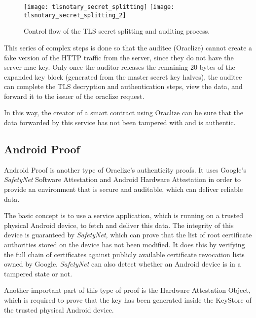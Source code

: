 \begin{figure}[H]
\texttt{[image: tlsnotary\_secret\_splitting]}
\texttt{[image: tlsnotary\_secret\_splitting\_2]}
\caption{Control flow of the TLS secret splitting and auditing process. \cite{tlsnotarywhitepaper}}
\end{figure}

This series of complex steps is done so that the auditee (Oraclize) cannot create a fake version of the HTTP traffic from the server, since they do not have the server mac key. Only once the auditor releases the remaining 20 bytes of the expanded key block (generated from the master secret key halves), the auditee can complete the TLS decryption and authentication steps, view the data, and forward it to the issuer of the oraclize request. 

In this way, the creator of a smart contract using Oraclize can be sure that the data forwarded by this service has not been tampered with and is authentic.
\subsection*{Android Proof}
Android Proof is another type of Oraclize's authenticity proofs. It uses Google's \emph{SafetyNet} Software Attestation and Android Hardware Attestation in order to provide an environment that is secure and auditable, which can deliver reliable data.

The basic concept is to use a service application, which is running on a trusted physical Android device, to fetch and deliver this data. The integrity of this device is guaranteed by \emph{SafetyNet}, which can prove that the list of root certificate authorities stored on the device has not been modified. It does this by verifying the full chain of certificates against publicly available certificate revocation lists owned by Google. \emph{SafetyNet} can also detect whether an Android device is in a tampered state or not.

Another important part of this type of proof is the Hardware Attestation Object, which is required to prove that the key has been generated inside the KeyStore of the trusted physical Android device.

